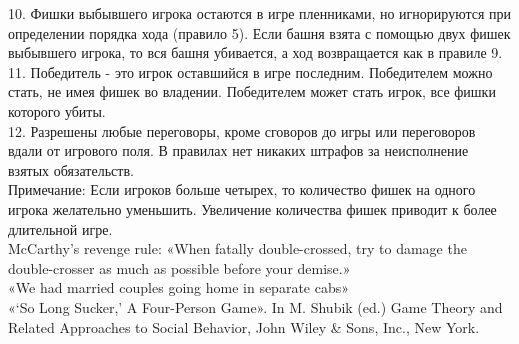 {10. Фишки выбывшего игрока остаются в игре пленниками, но игнорируются при определении порядка хода (правило 5). Если башня взята с помощью двух фишек выбывшего игрока, то вся башня убивается, а ход возвращается как в правиле 9.\\
11. Победитель - это игрок оставшийся в игре последним. Победителем можно стать, не имея фишек во владении. Победителем может стать игрок, все фишки которого убиты.\\
12. Разрешены любые переговоры, кроме сговоров до игры или переговоров вдали от игрового поля. В правилах нет никаких штрафов за неисполнение взятых обязательств.\\
Примечание: Если игроков больше четырех, то количество фишек на одного игрока желательно уменьшить. Увеличение количества фишек приводит к более длительной игре.\\
McCarthy's revenge rule: «When fatally double-crossed, try to damage the double-crosser as much as possible before your demise.»\\
«We had married couples going home in separate cabs»\\
«`So Long Sucker,' A Four-Person Game». In M. Shubik (ed.) Game Theory and Related Approaches to Social Behavior, John Wiley \& Sons, Inc., New York.}
\solution{}




\solution{}



